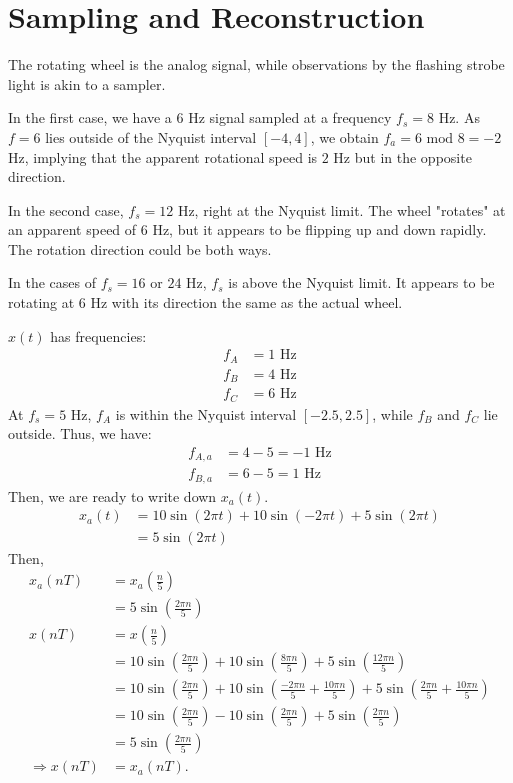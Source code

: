 \section{Sampling and Reconstruction}

\begin{itemize}

The rotating wheel is the analog signal, while observations by
the flashing strobe light is akin to a sampler.

In the first case,
we have a $6$ Hz signal sampled at a frequency $f_s = 8$ Hz. As
$f = 6$ lies outside of the Nyquist interval $[-4,4]$, we obtain
$f_a = 6 \text{ mod } 8 = -2$ Hz, implying that the apparent rotational speed
is $2$ Hz but in the opposite direction.

In the second case, $f_s = 12$ Hz, right at the Nyquist limit.
The wheel "rotates" at an apparent speed of $6$ Hz, but it appears
to be flipping up and down rapidly. The rotation direction could be both ways.

In the cases of $f_s = 16$ or $24$ Hz, $f_s$ is above the Nyquist limit.
It appears to be rotating at $6$ Hz with its direction the same
as the actual wheel.

$x(t)$ has frequencies:
\begin{align*}
	f_A &= 1 \text{ Hz} \\
	f_B &= 4 \text{ Hz} \\
	f_C &= 6 \text{ Hz}
\end{align*}
At $f_s = 5$ Hz, $f_A$ is within the Nyquist interval $[-2.5,2.5]$, while
$f_B$ and $f_C$ lie outside. Thus, we have:
\begin{align*}
	f_{A,a} &= 4-5 = -1 \text{ Hz} \\
	f_{B,a} &= 6-5 = 1 \text{ Hz}
\end{align*}
Then, we are ready to write down $x_a(t)$.
\begin{align*}
	x_a(t) &= 10\sin(2\pi t) + 10\sin(-2\pi t) + 5\sin(2\pi t) \\
		   &= 5\sin(2\pi t)
\end{align*}
Then,
\begin{align*}
	x_a(nT) &= x_a\left(\frac{n}{5}\right) \\
			&= 5\sin\left(\frac{2\pi n}{5}\right) \\
	x(nT)	&= x\left(\frac{n}{5}\right) \\
			&= 10\sin\left(\frac{2\pi n}{5}\right) + 10\sin\left(\frac{8\pi n}{5}\right) + 5\sin\left(\frac{12\pi n}{5}\right) \\
			&= 10\sin\left(\frac{2\pi n}{5}\right) + 10\sin\left(\frac{-2\pi n}{5}+\frac{10\pi n}{5}\right) + 5\sin\left(\frac{2\pi n}{5}+\frac{10\pi n}{5}\right) \\
			&= 10\sin\left(\frac{2\pi n}{5}\right) - 10\sin\left(\frac{2\pi n}{5}\right) + 5\sin\left(\frac{2\pi n}{5}\right) \\
			&= 5\sin\left(\frac{2\pi n}{5}\right) \\
	\Rightarrow x(nT) &= x_a(nT)\text{.}
\end{align*}


\end{itemize}
